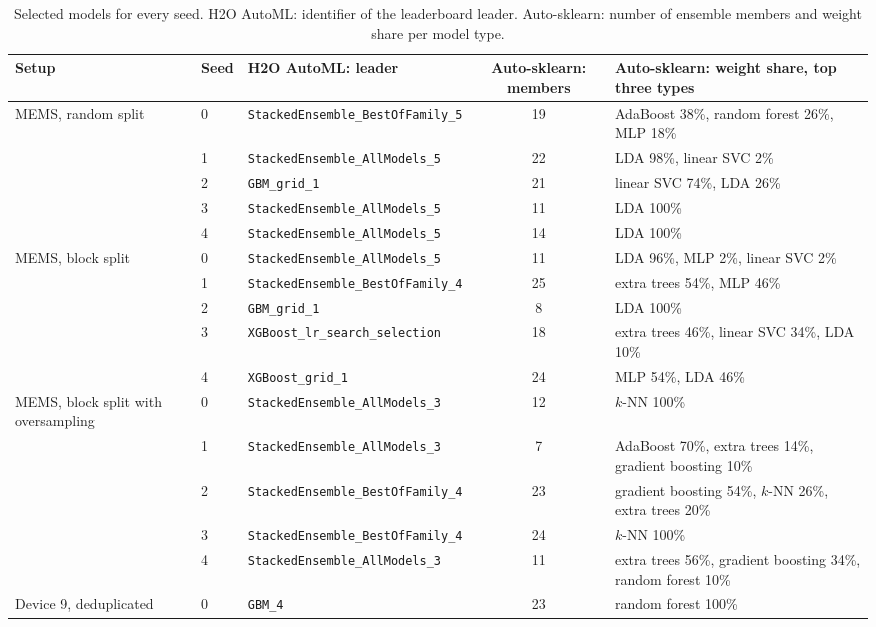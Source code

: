\begin{table}[t]
\centering
\caption{Selected models for every seed. H2O AutoML: identifier of the leaderboard leader. Auto-sklearn: number of ensemble members and weight share per model type.}
\label{tab:modelsseed}
\scriptsize
\setlength{\tabcolsep}{3pt}
\begin{tabular}{@{}llp{2.1in}cp{1.9in}@{}}
\toprule
Setup & Seed & H2O AutoML: leader & Auto-sklearn: members & Auto-sklearn: weight share, top three types \\
\midrule
MEMS, random split & 0 & \texttt{StackedEnsemble\_BestOfFamily\_5} & 19 & AdaBoost 38\%, random forest 26\%, MLP 18\% \\
 & 1 & \texttt{StackedEnsemble\_AllModels\_5} & 22 & LDA 98\%, linear SVC 2\% \\
 & 2 & \texttt{GBM\_grid\_1} & 21 & linear SVC 74\%, LDA 26\% \\
 & 3 & \texttt{StackedEnsemble\_AllModels\_5} & 11 & LDA 100\% \\
 & 4 & \texttt{StackedEnsemble\_AllModels\_5} & 14 & LDA 100\% \\
\midrule
MEMS, block split & 0 & \texttt{StackedEnsemble\_AllModels\_5} & 11 & LDA 96\%, MLP 2\%, linear SVC 2\% \\
 & 1 & \texttt{StackedEnsemble\_BestOfFamily\_4} & 25 & extra trees 54\%, MLP 46\% \\
 & 2 & \texttt{GBM\_grid\_1} & 8 & LDA 100\% \\
 & 3 & \texttt{XGBoost\_lr\_search\_selection} & 18 & extra trees 46\%, linear SVC 34\%, LDA 10\% \\
 & 4 & \texttt{XGBoost\_grid\_1} & 24 & MLP 54\%, LDA 46\% \\
\midrule
MEMS, block split with oversampling & 0 & \texttt{StackedEnsemble\_AllModels\_3} & 12 & $k$-NN 100\% \\
 & 1 & \texttt{StackedEnsemble\_AllModels\_3} & 7 & AdaBoost 70\%, extra trees 14\%, gradient boosting 10\% \\
 & 2 & \texttt{StackedEnsemble\_BestOfFamily\_4} & 23 & gradient boosting 54\%, $k$-NN 26\%, extra trees 20\% \\
 & 3 & \texttt{StackedEnsemble\_BestOfFamily\_4} & 24 & $k$-NN 100\% \\
 & 4 & \texttt{StackedEnsemble\_AllModels\_3} & 11 & extra trees 56\%, gradient boosting 34\%, random forest 10\% \\
\midrule
Device 9, deduplicated & 0 & \texttt{GBM\_4} & 23 & random forest 100\% \\

\end{tabular}
\end{table}
